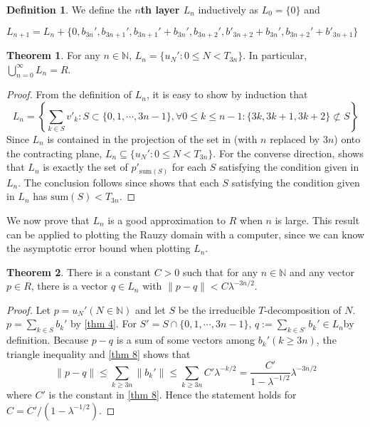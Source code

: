 \documentclass{article}
\theoremstyle{definition}
\newtheorem{theorem}{Theorem}
\newtheorem*{definition}{Definition}
\begin{document}
\begin{definition}
    We define the \textbf{$n$th layer $L_n$} inductively as $L_0=\{0\} $ and
    \begin{center}
        $L_{n+1}=L_n+\{0, b_{3n}', b_{3n+1}', b_{3n+1}'+b_{3n}',b_{3n+2}', b'_{3n+2}+b_{3n}',b_{3n+2}'+b'_{3n+1}\}$
    \end{center}
\end{definition}
\begin{theorem}
\label{thm 10}
For any $n\in \mathbb{N}$, $L_n=\{u_N':0\leq N< T_{3n}\}$. In particular, $\bigcup_{n=0}^\infty L_n=R$.
\end{theorem}
\begin{proof}
    From the definition of $L_n$, it is easy to show by induction that \[
    L_n=\left\{\sum_{k\in S}v'_k : S\subset\{0,1,\cdots,3n-1\}, \forall 0\leq k\leq n-1:\{3k, 3k+1, 3k+2\} \not\subset S \right\}
    \]
    Since $L_n$ is contained in the projection of the set in  (with $n$ replaced by $3n$) onto the contracting plane, $L_n\subseteq \{u_N':0\leq N< T_{3n}\}$. For the converse direction,  shows that $L_n$ is exactly the set of $p'_{\text{sum}(S)}$ for each $S$ satisfying the condition given in $L_n$. The conclusion follows since  shows that each $S$ satisfying the condition given in $L_n$ has $\text{sum}(S)<T_{3n}$. 
\end{proof}

We now prove that $L_n$ is a good approximation to $R$ when $n$ is large. This result can be applied to plotting the Rauzy domain with a computer, since we can know the asymptotic error bound when plotting $L_n$.

\begin{theorem}
\label {thm 11}
There is a constant $C>0$ such that for any $n\in\mathbb{N}$ and any vector $p\in R$, there is a vector $q\in L_n$ with $\| p-q\|<C\lambda^{-3n/2}$.
\end{theorem}

\begin{proof}
Let $p=u_N'(N\in\mathbb{N})$ and let $S$ be the irreducible $T$-decomposition of $N$. $p=\sum_{k\in S}b_k'$ by \cref{thm 4}. For $S'=S\cap\{0,1,\cdots,3n-1\}$, $q:=\sum_{k\in S'}b_k'\in L_n$by definition. Because $p-q$ is a sum of some vectors among $b_{k}'(k\geq 3n)$, the triangle inequality and \cref{thm 8} shows that
\[
\|p-q\|\leq\sum_{k\geq 3n}\|b_k' \|\leq\sum_{k\geq 3n}C'\lambda^{-k/2}=\frac{C'}{1-\lambda^{-1/2}}\lambda^{-3n/2}
\]
where $C'$ is the constant in \cref{thm 8}. Hence the statement holds for $C=C'/(1-\lambda^{-1/2})$.
\end{proof}
\end{document}
